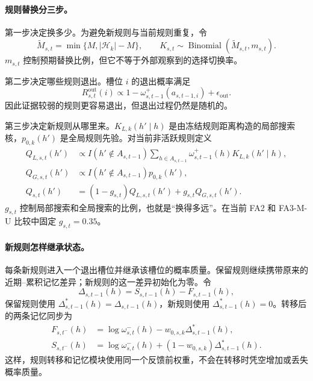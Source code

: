 \paragraph{规则替换分三步。}
第一步决定换多少。为避免新规则与当前规则重复，令
\begin{equation}
\widetilde M_{s,t}=\min\{M,|\mathcal H_k|-M\},
\qquad
K_{s,t}\sim\operatorname{Binomial}(\widetilde M_{s,t},m_{s,t}).
\label{eq:model0806-replacement-count}
\end{equation}
$m_{s,t}$ 控制预期替换比例，但它不等于外部观察到的选择切换率。

第二步决定哪些规则退出。槽位 $i$ 的退出概率满足
\begin{equation}
R^{\mathrm{out}}_{s,t}(i)
\propto 1-\omega^+_{s,t-1}(a_{s,t-1,i})+\epsilon_{\mathrm{out}}.
\label{eq:model0806-exit-kernel}
\end{equation}
因此证据较弱的规则更容易退出，但退出过程仍然是随机的。

第三步决定新规则从哪里来。$K_{L,k}(h'\mid h)$ 是由冻结规则距离构造的局部搜索核，$p_{0,k}(h')$ 是全局规则先验。对当前非活跃规则定义
\begin{align}
Q_{L,s,t}(h')
&\propto I(h'\notin A_{s,t-1})
\sum_{h\in A_{s,t-1}}\omega^+_{s,t-1}(h)K_{L,k}(h'\mid h),\\
Q_{G,s,t}(h')
&\propto I(h'\notin A_{s,t-1})p_{0,k}(h'),\\
Q_{s,t}(h')
&=(1-g_{s,t})Q_{L,s,t}(h')+g_{s,t}Q_{G,s,t}(h').
\label{eq:model0806-newcomer-proposal}
\end{align}
$g_{s,t}$ 控制局部搜索和全局搜索的比例，也就是“换得多远”。在当前 FA2 和 FA3-M-U 比较中固定 $g_{s,t}=0.35$。

\paragraph{新规则怎样继承状态。}
每条新规则进入一个退出槽位并继承该槽位的概率质量。保留规则继续携带原来的近期--累积记忆差异；新规则的这一差异初始化为零。令
\begin{equation}
\Delta_{s,t-1}(h)=S_{s,t-1}(h)-F_{s,t-1}(h),
\end{equation}
保留规则使用 $\Delta^*_{s,t-1}(h)=\Delta_{s,t-1}(h)$，新规则使用 $\Delta^*_{s,t-1}(h)=0$。转移后的两条记忆同步为
\begin{align}
F_{s,t^-}(h)
&=\log\omega^-_{s,t}(h)-w_{0,s,k}\Delta^*_{s,t-1}(h),\\
S_{s,t^-}(h)
&=\log\omega^-_{s,t}(h)+(1-w_{0,s,k})\Delta^*_{s,t-1}(h).
\label{eq:model0806-memory-sync}
\end{align}
这样，规则转移和记忆模块使用同一个反馈前权重，不会在转移时凭空增加或丢失概率质量。

